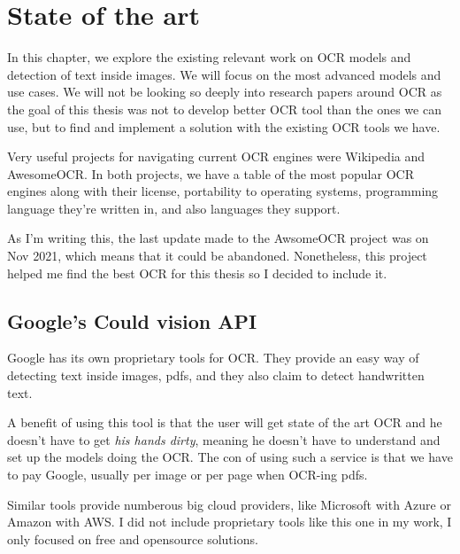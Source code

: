 \documentclass[
  digital,     %
  oneside,     %
  nosansbold,  %
  nocolorbold, %
  nolof,         %
  nolot,         %
]{fithesis4}
\begin{document}

\chapter{State of the art}

In this chapter, we explore the existing relevant work on OCR models and detection of text inside images. We will focus on the most advanced models and use cases. We will not be looking so deeply into research papers around OCR as the goal of this thesis was not to develop better OCR tool than the ones we can use, but to find and implement a solution with the existing OCR tools we have.

Very useful projects for navigating current OCR engines were Wikipedia\cite{ocrwikipedia} and AwesomeOCR\cite{awesomeocr}. In both projects, we have a table of the most popular OCR engines along with their license, portability to operating systems, programming language they're written in, and also languages they support.

As I'm writing this, the last update made to the AwsomeOCR project was on Nov 2021, which means that it could be abandoned. Nonetheless, this project helped me find the best OCR for this thesis so I decided to include it.

\section{Google's Could vision API \cite{googleapi}}

Google has its own proprietary tools for OCR. They provide an easy way of detecting text inside images, pdfs, and they also claim to detect handwritten text.

A benefit of using this tool is that the user will get state of the art OCR and he doesn't have to get \emph{his hands dirty}, meaning he doesn't have to understand and set up the models doing the OCR. The con of using such a service is that we have to pay Google, usually per image or per page when OCR-ing pdfs.

Similar tools provide numberous big cloud providers, like Microsoft with Azure\cite{azurevision} or Amazon with AWS\cite{awstextract}. I did not include proprietary tools like this one in my work, I only focused on free and opensource solutions.
\end{document}
